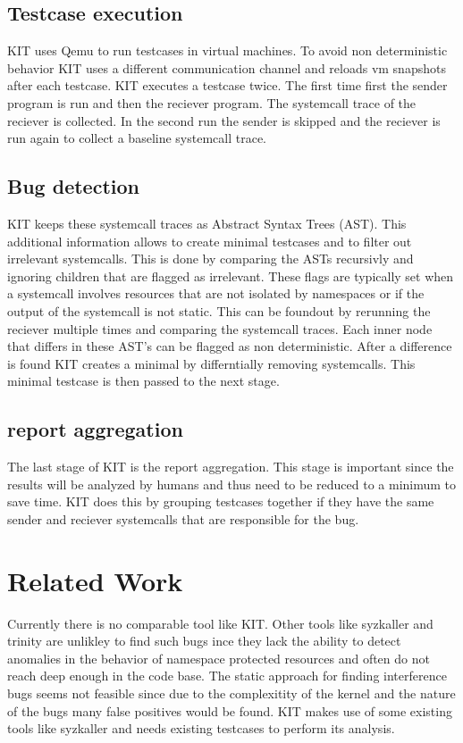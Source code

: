 \documentclass[10pt,twocolumn,a4paper]{article}
\begin{document}
\subsection{Testcase execution}
KIT uses Qemu to run testcases in virtual machines. To avoid non deterministic behavior KIT uses
a different communication channel and reloads vm snapshots after each testcase. KIT executes a
testcase twice. The first time first the sender program is run and then the reciever program. The
systemcall trace of the reciever is collected. In the second run the sender is skipped and the reciever
is run again to collect a baseline systemcall trace\cite{0}. 
\subsection{Bug detection}
KIT keeps these systemcall traces as Abstract Syntax Trees (AST). This additional information allows 
to create minimal testcases and to filter out irrelevant systemcalls. This is done by comparing the ASTs
recursivly and ignoring children that are flagged as irrelevant. These flags are typically set when
a systemcall involves resources that are not isolated by namespaces or if the output of the
systemcall is not static. This can be foundout by rerunning the reciever multiple times and
comparing the systemcall traces. Each inner node that differs in these AST's can be flagged as non
deterministic.
After a difference is found KIT creates a minimal by differntially removing systemcalls. This
minimal testcase is then passed to the next stage\cite{0}.
\subsection{report aggregation}
The last stage of KIT is the report aggregation. This stage is important since the results will be
analyzed by humans and thus need to be reduced to a minimum to save time. KIT does this by grouping
testcases together if they have the same sender and reciever systemcalls that are responsible for
the bug\cite{0}. 

\section{Related Work}
Currently there is no comparable tool like KIT. Other tools like syzkaller\cite{4} and trinity\cite{5} are
unlikley to find such bugs ince they lack the ability to detect anomalies in the behavior of
namespace protected resources and often do not reach deep enough in the code base.
The static approach for finding interference bugs seems not feasible
since due to the complexitity of the kernel and the nature of the bugs many false positives would
be found. KIT makes use of some existing tools like syzkaller and needs existing testcases to
perform its analysis\cite{0}\cite{2}.
\end{document}
